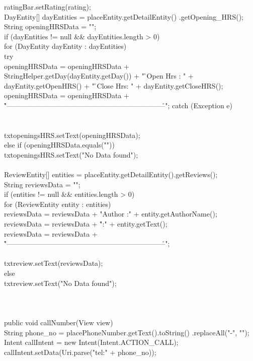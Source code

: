 \documentclass[12pt,a4paper]{article}
\begin{document}
{{{		ratingBar.setRating(rating);\\

		DayEntity[] dayEntities = placeEntity.getDetailEntity()
				.getOpening_HRS();\\
		String openingHRSData = "";\\
		if (dayEntities != null && dayEntities.length > 0) {\\
			for (DayEntity dayEntity : dayEntities) {\\
				try {\\
					openingHRSData = openingHRSData
							+ StringHelper.getDay(dayEntity.getDay())
							+ " \r\n Open Hrs :  " + dayEntity.getOpenHRS()
							+ " \r\n Close Hrs:  " + dayEntity.getCloseHRS();\\
					openingHRSData = openingHRSData
							+ "\r\n--------------------------------------------------------------------\r\n";
				} catch (Exception e) {\\

				}\\
			}\\
			txtopeningsHRS.setText(openingHRSData);\\
		} else if (openingHRSData.equals("")) {\\
			txtopeningsHRS.setText("No Data found");\\
		}\\

		ReviewEntity[] entities = placeEntity.getDetailEntity().getReviews();\\
		String reviewsData = "";\\
		if (entities != null && entities.length > 0) {\\
			for (ReviewEntity entity : entities) {\\
				reviewsData = reviewsData + "Author :" + entity.getAuthorName();\\
				reviewsData = reviewsData + "\r\nReview :" + entity.getText();\\
				reviewsData = reviewsData
						+ "\r\n--------------------------------------------------------------------\r\n";\\
			}\\
			txtreview.setText(reviewsData);\\
		} else {\\
			txtreview.setText("No Data found");\\
		}\\

	}\\
\\
	public void callNumber(View view) {\\
		String phone_no = placePhoneNumber.getText().toString()
				.replaceAll("-", "");\\
		Intent callIntent = new Intent(Intent.ACTION_CALL);\\
		callIntent.setData(Uri.parse("tel:" + phone_no));\\

}}}
\end{document}
